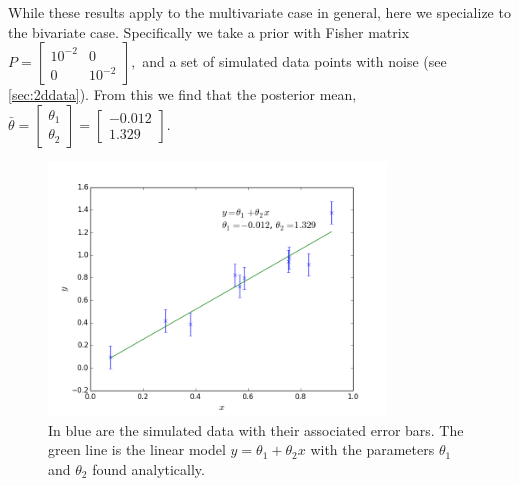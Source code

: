 \documentclass[a4paper,11pt,twoside]{article}
\begin{document}
While these results apply to the multivariate case in general, here we
specialize to the bivariate case. Specifically we take a prior with Fisher matrix
	$ P = \begin{bmatrix}
		10^{-2} & 0 \\
		0 & 10^{-2}
	\end{bmatrix}, $
and a set of simulated data points with noise (see \cref{sec:2ddata}).
From this we find that the posterior mean, 
	$\bar{\theta} = \begin{bmatrix} 
		\theta_1 \\ 
		\theta_2 \end{bmatrix} = \begin{bmatrix} 
		-0.012 \\ 
	1.329 \end{bmatrix}$.

\begin{figure}[htb]
	\centering
	\includegraphics[width=0.8\textwidth]{2ddata.png}
	\caption{In blue are the simulated data with their associated
	error bars. The green line is the linear model $y = \theta_1 + \theta_2
	x$ with the parameters $\theta_1$ and $\theta_2$ found analytically.}
	\label{fig:model}
\end{figure}
\end{document}
